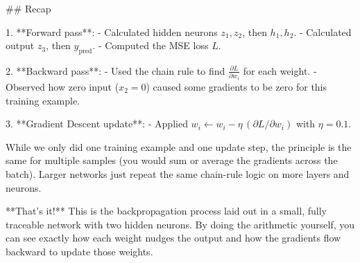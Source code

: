 ## Recap

1. **Forward pass**:  
   - Calculated hidden neurons \(z_1, z_2\), then \(h_1, h_2\).  
   - Calculated output \(z_3\), then \(y_{\text{pred}}\).  
   - Computed the MSE loss \(L\).

2. **Backward pass**:  
   - Used the chain rule to find \(\tfrac{\partial L}{\partial w_i}\) for each weight.  
   - Observed how zero input (\(x_2=0\)) caused some gradients to be zero for this training example.

3. **Gradient Descent update**:  
   - Applied \(w_i \leftarrow w_i - \eta\,(\partial L/\partial w_i)\) with \(\eta=0.1\).

While we only did one training example and one update step, the principle is the same for multiple samples (you would sum or average the gradients across the batch). Larger networks just repeat the same chain-rule logic on more layers and neurons.

**That’s it!** This is the backpropagation process laid out in a small, fully traceable network with two hidden neurons. By doing the arithmetic yourself, you can see exactly how each weight nudges the output and how the gradients flow backward to update those weights.

